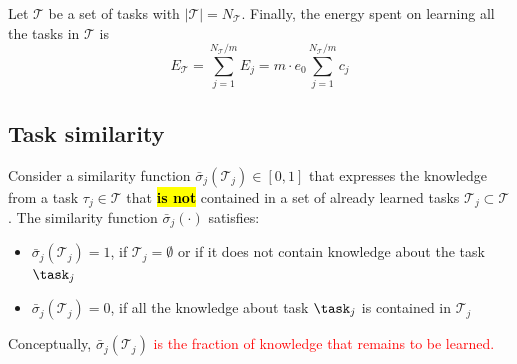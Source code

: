 Let $\mathcal{T}$ be a set of tasks with $|\mathcal{T}| = N_\mathcal{T}$. Finally, the energy spent on learning all the tasks in $\mathcal{T}$ is %
\begin{equation}\label{eq:total_energy}
    E_{\mathcal{T}} = \sum_{j=1}^{{N_{\mathcal{T}}}/{m}} E_j = m \cdot e_0 \sum_{j=1}^{{N_{\mathcal{T}}}/{m}} c_j%
\end{equation}

\subsection{Task similarity}
Consider a similarity function $\bar{\sigma}_j(\mathcal{T}_j)\in [0,1]$ that expresses the knowledge from a task  $\tau_j \in \mathcal{T}$ that \hl{\textbf{is not}} contained in a set of already learned tasks $\mathcal{T}_j \subset \mathcal{T}$. The similarity function $\bar{\sigma}_j(\cdot)$ satisfies:
\begin{itemize}
	\item $\bar{\sigma}_j(\mathcal{T}_j) = 1$, if $\mathcal{T}_j=\emptyset$ or if it does not contain knowledge about the task $\task_j$
	\item $\bar{\sigma}_j(\mathcal{T}_j) = 0$, if all the knowledge about task $\task_j$ is contained in $\mathcal{T}_j$
\end{itemize} 
Conceptually, $\bar{\sigma}_j(\mathcal{T}_j)$ \textcolor{red}{is the fraction of knowledge that remains to be learned.}

